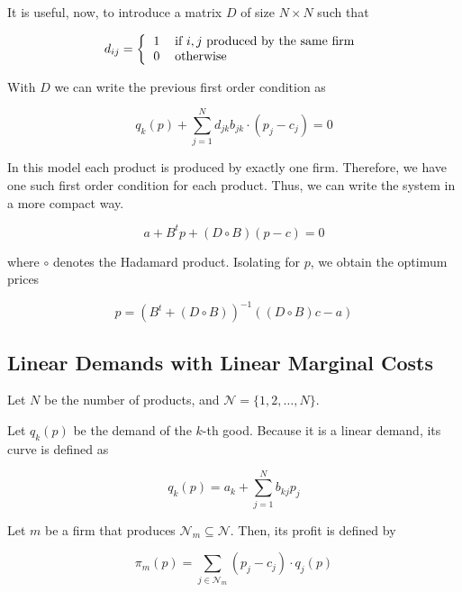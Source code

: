 \documentclass[12pt]{article}
\begin{document}
It is useful, now, to introduce a matrix $D$ of size $N \times N$ such that

\begin{equation*}
d_{ij} = \left\{
\begin{tabular}{ll}
1 & if $i,j$ produced by the same firm\\
0 & otherwise
\end{tabular}\right.
\end{equation*}

With $D$ we can write the previous first order condition as

\begin{equation*}
q_k(p) + \sum_{j = 1}^N d_{jk}b_{jk} \cdot (p_j - c_j) = 0
\end{equation*}

In this model each product is produced by exactly one firm. Therefore, we have one such first order condition for each product. Thus, we can write the system in a more compact way. 

\begin{equation*}
a + B^t p + (D \circ B)(p - c) = 0
\end{equation*}

where $\circ$ denotes the Hadamard product.
Isolating for $p$, we obtain the optimum prices

\begin{equation*}
p = (B^t + (D \circ B))^{-1}((D \circ B) c - a)
\end{equation*}


\subsection{Linear Demands with Linear Marginal Costs}

Let $N$ be the number of products, and $\mathcal{N} = \{1, 2, \dots, N\}$.

Let $q_k (p)$ be the demand of the $k$-th good. Because it is a linear demand, its curve is defined as

\begin{equation*}
q_k(p) = a_k + \sum_{j=1}^N b_{kj}p_j
\end{equation*}

Let $m$ be a firm that produces $\mathcal{N}_m \subseteq \mathcal{N}$. Then, its profit is defined by

\begin{equation*}
\pi_m(p) = \sum_{j \in \mathcal{N}_m} (p_j - c_j)\cdot q_j(p)
\end{equation*}
\end{document}

